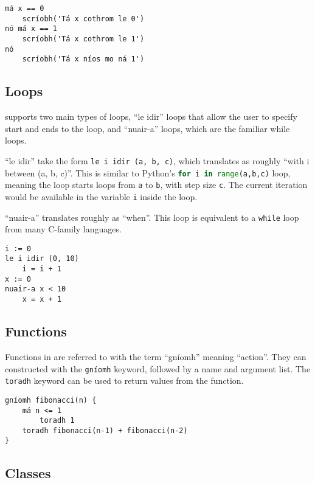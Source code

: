             \begin{lstlisting}[language=setanta, frame=single, caption=Setanta conditionals]
má x == 0
    scríobh('Tá x cothrom le 0')
nó má x == 1
    scríobh('Tá x cothrom le 1')
nó
    scríobh('Tá x níos mo ná 1')
            \end{lstlisting}
\subsection{Loops}

            \Setanta{} supports two main types of loops, ``le idir'' loops that allow the user to specify start and ends to the loop, and ``nuair-a'' loops, which are the familiar while loops.

            ``le idir'' take the form \lstinline[language=setanta]|le i idir (a, b, c)|, which translates as roughly ``with i between (a, b, c)''. This is similar to Python's \lstinline[language=python]|for i in range(a,b,c)| loop, meaning the loop starts loops from \verb|a| to \verb|b|, with step size \verb|c|. The current iteration would be available in the variable \verb|i| inside the loop.

            ``nuair-a'' translates roughly as ``when''. This loop is equivalent to a \verb|while| loop from many C-family languages.
            \begin{lstlisting}[language=setanta, frame=single, caption=Setanta loops]
i := 0
le i idir (0, 10)
    i = i + 1
x := 0
nuair-a x < 10
    x = x + 1
            \end{lstlisting}

    \subsection{Functions}

            Functions in \Setanta{} are referred to with the term ``gníomh'' meaning ``action''. They can constructed with the \lstinline[language=setanta]|gníomh| keyword, followed by a name and argument list. The \lstinline[language=setanta]|toradh| keyword can be used to return values from the function.
            \begin{lstlisting}[language=setanta, frame=single, caption=Setanta function example]
gníomh fibonacci(n) {
    má n <= 1
        toradh 1
    toradh fibonacci(n-1) + fibonacci(n-2)
}
            \end{lstlisting}

\subsection{Classes}

